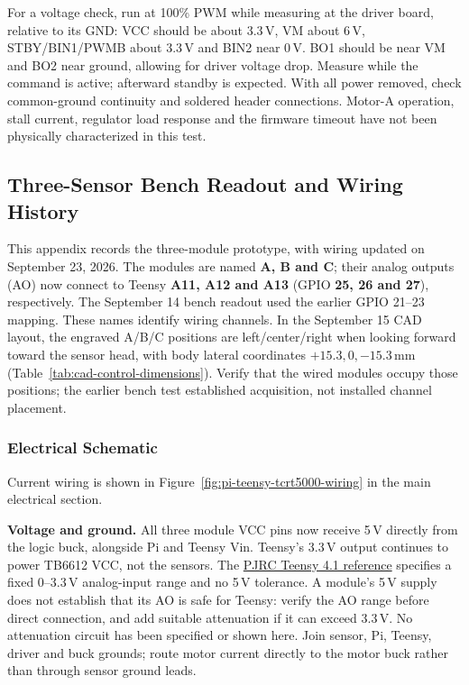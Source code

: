 For a voltage check, run at 100\% PWM while measuring at the driver board, relative to its GND: VCC should be about 3.3\,V, VM about 6\,V, STBY/BIN1/PWMB about 3.3\,V and BIN2 near 0\,V. BO1 should be near VM and BO2 near ground, allowing for driver voltage drop. Measure while the command is active; afterward standby is expected. With all power removed, check common-ground continuity and soldered header connections. Motor-A operation, stall current, regulator load response and the firmware timeout have not been physically characterized in this test.
\clearpage
\subsection{Three-Sensor Bench Readout and Wiring History}
\label{app:tcrt5000-prototype}

This appendix records the three-module prototype, with wiring updated on September 23, 2026. The modules are named \textbf{A, B and C}; their analog outputs (AO) now connect to Teensy \textbf{A11, A12 and A13} (GPIO \textbf{25, 26 and 27}), respectively. The September 14 bench readout used the earlier GPIO 21--23 mapping. These names identify wiring channels. In the September 15 CAD layout, the engraved A/B/C positions are left/center/right when looking forward toward the sensor head, with body lateral coordinates $+15.3,0,-15.3$\,mm (Table~\ref{tab:cad-control-dimensions}). Verify that the wired modules occupy those positions; the earlier bench test established acquisition, not installed channel placement.

\subsubsection{Electrical Schematic}
Current wiring is shown in Figure~\ref{fig:pi-teensy-tcrt5000-wiring} in the main electrical section.

\noindent\textbf{Voltage and ground.} All three module VCC pins now receive 5\,V directly from the logic buck, alongside Pi and Teensy Vin. Teensy's 3.3\,V output continues to power TB6612 VCC, not the sensors. The \href{https://www.pjrc.com/store/teensy41.html}{PJRC Teensy 4.1 reference} specifies a fixed 0--3.3\,V analog-input range and no 5\,V tolerance. A module's 5\,V supply does not establish that its AO is safe for Teensy: verify the AO range before direct connection, and add suitable attenuation if it can exceed 3.3\,V. No attenuation circuit has been specified or shown here. Join sensor, Pi, Teensy, driver and buck grounds; route motor current directly to the motor buck rather than through sensor ground leads.

